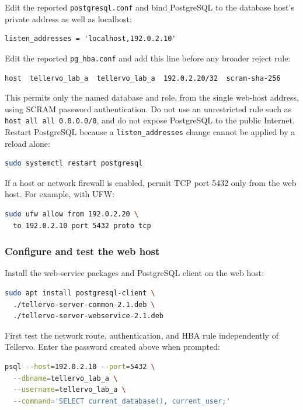 Edit the reported \verb|postgresql.conf| and bind PostgreSQL to the database
host's private address as well as localhost:

\begin{lstlisting}
listen_addresses = 'localhost,192.0.2.10'
\end{lstlisting}

Edit the reported \verb|pg_hba.conf| and add this line before any broader
reject rule:

\begin{lstlisting}
host  tellervo_lab_a  tellervo_lab_a  192.0.2.20/32  scram-sha-256
\end{lstlisting}

This permits only the named database and role, from the single web-host
address, using SCRAM password authentication. Do not use an unrestricted rule
such as \verb|host all all 0.0.0.0/0|, and do not expose PostgreSQL to the
public Internet. Restart PostgreSQL because a \verb|listen_addresses| change
cannot be applied by a reload alone:

\begin{lstlisting}[language=bash]
sudo systemctl restart postgresql
\end{lstlisting}

If a host or network firewall is enabled, permit TCP port 5432 only from the
web host. For example, with UFW:

\begin{lstlisting}[language=bash]
sudo ufw allow from 192.0.2.20 \
  to 192.0.2.10 port 5432 proto tcp
\end{lstlisting}

\subsubsection{Configure and test the web host}

Install the web-service packages and PostgreSQL client on the web host:

\begin{lstlisting}[language=bash]
sudo apt install postgresql-client \
  ./tellervo-server-common-2.1.deb \
  ./tellervo-server-webservice-2.1.deb
\end{lstlisting}

First test the network route, authentication, and HBA rule independently of
Tellervo. Enter the password created above when prompted:

\begin{lstlisting}[language=bash]
psql --host=192.0.2.10 --port=5432 \
  --dbname=tellervo_lab_a \
  --username=tellervo_lab_a \
  --command='SELECT current_database(), current_user;'
\end{lstlisting}

